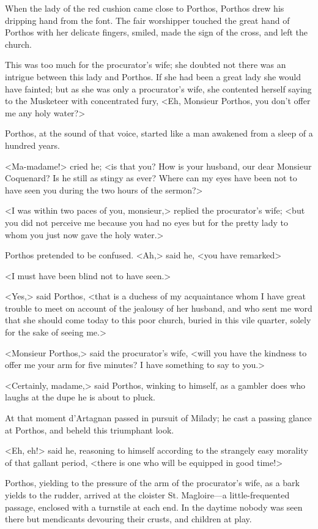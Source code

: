 When the lady of the red cushion came close to Porthos, Porthos drew his dripping hand from the font. The fair worshipper touched the great hand of Porthos with her delicate fingers, smiled, made the sign of the cross, and left the church. 

This was too much for the procurator's wife; she doubted not there was an intrigue between this lady and Porthos. If she had been a great lady she would have fainted; but as she was only a procurator's wife, she contented herself saying to the Musketeer with concentrated fury, <Eh, Monsieur Porthos, you don't offer me any holy water?> 

Porthos, at the sound of that voice, started like a man awakened from a sleep of a hundred years. 

<Ma-madame!> cried he; <is that you? How is your husband, our dear Monsieur Coquenard? Is he still as stingy as ever? Where can my eyes have been not to have seen you during the two hours of the sermon?> 

<I was within two paces of you, monsieur,> replied the procurator's wife; <but you did not perceive me because you had no eyes but for the pretty lady to whom you just now gave the holy water.> 

Porthos pretended to be confused. <Ah,> said he, <you have remarked\longdash> 

<I must have been blind not to have seen.> 

<Yes,> said Porthos, <that is a duchess of my acquaintance whom I have great trouble to meet on account of the jealousy of her husband, and who sent me word that she should come today to this poor church, buried in this vile quarter, solely for the sake of seeing me.> 

<Monsieur Porthos,> said the procurator's wife, <will you have the kindness to offer me your arm for five minutes? I have something to say to you.> 

<Certainly, madame,> said Porthos, winking to himself, as a gambler does who laughs at the dupe he is about to pluck. 

At that moment d'Artagnan passed in pursuit of Milady; he cast a passing glance at Porthos, and beheld this triumphant look. 

<Eh, eh!> said he, reasoning to himself according to the strangely easy morality of that gallant period, <there is one who will be equipped in good time!> 

Porthos, yielding to the pressure of the arm of the procurator's wife, as a bark yields to the rudder, arrived at the cloister St. Magloire---a little-frequented passage, enclosed with a turnstile at each end. In the daytime nobody was seen there but mendicants devouring their crusts, and children at play. 

